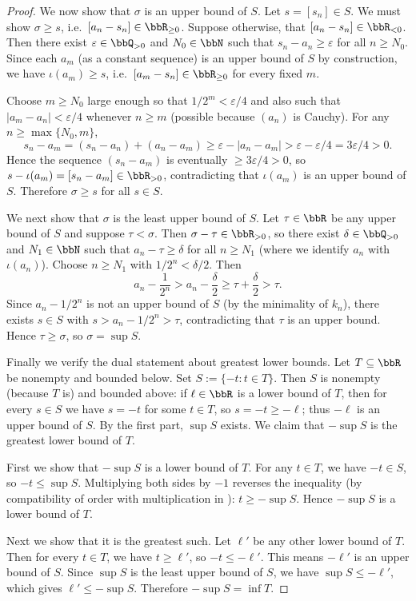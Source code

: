\begin{proof}
    We now show that $\sigma$ is an upper bound of $S$.
    Let $s = [s_n] \in S$. We must show $\sigma \ge s$, i.e.\ $[a_n - s_n] \in \bbR_{\ge 0}$. Suppose otherwise, that $[a_n - s_n] \in \bbR_{<0}$. Then there exist $\varepsilon \in \bbQ_{>0}$ and $N_0 \in \bbN$ such that $s_n - a_n \ge \varepsilon$ for all $n \ge N_0$. Since each $a_m$ (as a constant sequence) is an upper bound of $S$ by construction, we have $\iota(a_m) \ge s$, i.e.\ $[a_m - s_n] \in \bbR_{\ge 0}$ for every fixed $m$.

    Choose $m \ge N_0$ large enough so that $1/2^m < \varepsilon/4$ and also such that $|a_m - a_n| < \varepsilon/4$ whenever $n \ge m$ (possible because $(a_n)$ is Cauchy). For any $n \ge \max\{N_0, m\}$,
    $$s_n - a_m = (s_n - a_n) + (a_n - a_m) \ge \varepsilon - |a_n - a_m| > \varepsilon - \varepsilon/4 = 3\varepsilon/4 > 0.$$
    Hence the sequence $(s_n - a_m)$ is eventually $\ge 3\varepsilon/4 > 0$, so $s - \iota(a_m) = [s_n - a_m] \in \bbR_{>0}$, contradicting that $\iota(a_m)$ is an upper bound of $S$. Therefore $\sigma \ge s$ for all $s \in S$.

    We next show that $\sigma$ is the least upper bound of $S$.
    Let $\tau \in \bbR$ be any upper bound of $S$ and suppose $\tau < \sigma$. Then $\sigma - \tau \in \bbR_{>0}$, so there exist $\delta \in \bbQ_{>0}$ and $N_1 \in \bbN$ such that $a_n - \tau \ge \delta$ for all $n \ge N_1$ (where we identify $a_n$ with $\iota(a_n)$). Choose $n \ge N_1$ with $1/2^n < \delta/2$. Then
    $$a_n - \frac{1}{2^n} > a_n - \frac{\delta}{2} \ge \tau + \frac{\delta}{2} > \tau.$$
    Since $a_n - 1/2^n$ is not an upper bound of $S$ (by the minimality of $k_n$), there exists $s \in S$ with $s > a_n - 1/2^n > \tau$, contradicting that $\tau$ is an upper bound. Hence $\tau \ge \sigma$, so $\sigma = \sup S$.

    Finally we verify the dual statement about greatest lower bounds. Let $T \subseteq \bbR$ be nonempty and bounded below. Set $S := \{-t : t \in T\}$. Then $S$ is nonempty (because $T$ is) and bounded above: if $\ell \in \bbR$ is a lower bound of $T$, then for every $s \in S$ we have $s = -t$ for some $t \in T$, so $s = -t \ge -\ell$; thus $-\ell$ is an upper bound of $S$. By the first part, $\sup S$ exists. We claim that $-\sup S$ is the greatest lower bound of $T$.

    First we show that $-\sup S$ is a lower bound of $T$. For any $t \in T$, we have $-t \in S$, so $-t \le \sup S$. Multiplying both sides by $-1$ reverses the inequality (by compatibility of order with multiplication in ): $t \ge -\sup S$. Hence $-\sup S$ is a lower bound of $T$.

    Next we show that it is the greatest such. Let $\ell'$ be any other lower bound of $T$. Then for every $t \in T$, we have $t \ge \ell'$, so $-t \le -\ell'$. This means $-\ell'$ is an upper bound of $S$. Since $\sup S$ is the least upper bound of $S$, we have $\sup S \le -\ell'$, which gives $\ell' \le -\sup S$. Therefore $-\sup S = \inf T$.
\end{proof}